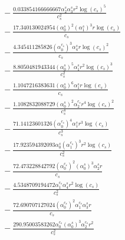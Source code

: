 \documentclass[10pt]{article}
\begin{document}
\begin{align*}
&{}  - \frac{0.033854166666667 \alpha_{2}^s \alpha_{3}^s r^{2} \log{\left(c_{s} \right)}^{5}}{c_{s}^{2}} \\
&{}  - \frac{17.340130024954 \left(\alpha_{0}^s\right)^{2} \left(\alpha_{1}^s\right)^{3} r \log{\left(c_{s} \right)}}{c_{s}} \\
&{}  - \frac{4.345411285826 \left(\alpha_{0}^{c_s}\right)^{3} \alpha_{4}^s r \log{\left(c_{s} \right)}^{2}}{c_{s}} \\
&{}  - \frac{8.8050481943344 \left(\alpha_{0}^s\right)^{5} \alpha_{1}^s r^{2} \log{\left(c_{s} \right)}^{3}}{c_{s}^{2}} \\
&{}  - \frac{1.1047216383631 \left(\alpha_{0}^s\right)^{6} \alpha_{1}^s r \log{\left(c_{s} \right)}}{c_{s}} \\
&{}  - \frac{1.1082832088729 \left(\alpha_{0}^s\right)^{2} \alpha_{2}^{c_s} r^{4} \log{\left(c_{s} \right)}^{2}}{c_{s}^{4}} \\
&{}  - \frac{71.14123601326 \left(\alpha_{0}^{c_s}\right)^{4} \alpha_{1}^s r^{3} \log{\left(c_{s} \right)}}{c_{s}^{3}} \\
&{}  - \frac{17.923594392093 \alpha_{0}^s \left(\alpha_{1}^{c_s}\right)^{3} r^{2} \log{\left(c_{s} \right)}}{c_{s}^{2}} \\
&{}  - \frac{72.473228842792 \left(\alpha_{0}^{c_s}\right)^{2} \left(\alpha_{0}^s\right)^{3} \alpha_{2}^s r}{c_{s}} \\
&{}  - \frac{4.5348709194472 \alpha_{1}^{c_s} \alpha_{4}^s r^{2} \log{\left(c_{s} \right)}}{c_{s}^{2}} \\
&{}  - \frac{72.690707127024 \left(\alpha_{0}^{c_s}\right)^{2} \alpha_{1}^{c_s} \alpha_{3}^s r}{c_{s}} \\
&{}  - \frac{290.95003583262 \alpha_{0}^{c_s} \left(\alpha_{0}^s\right)^{3} \alpha_{2}^{c_s} r^{2}}{c_{s}^{2}}
\end{align*}
\end{document}
